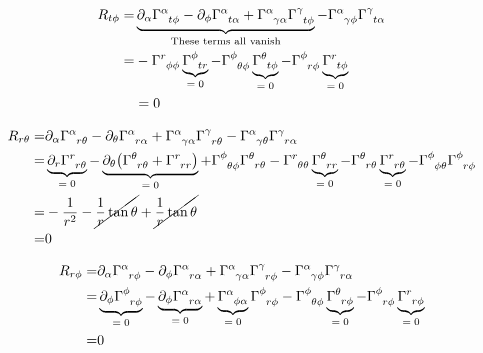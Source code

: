 \documentclass[]{article}
\begin{document}
\begin{align*}
	R_{t\phi} =& \underbrace{\partial_\alpha \Gamma\indices{^\alpha_{t\phi}} - \partial_\phi \Gamma\indices{^\alpha_{t\alpha}} + \Gamma\indices{^\alpha_{\gamma\alpha}} \Gamma\indices{^\gamma_{t\phi}} }_\text{These terms all vanish}- \Gamma\indices{^\alpha_{\gamma\phi}} \Gamma\indices{^\gamma_{t\alpha}}\\
	=& - \Gamma\indices{^r_{\phi\phi}} \underbrace{\Gamma\indices{^\phi_{tr}}}_\text{$=0$} - \Gamma\indices{^\phi_{\theta\phi}} \underbrace{\Gamma\indices{^\theta_{t\phi}}}_\text{$=0$}- \Gamma\indices{^\phi_{r\phi}} \underbrace{\Gamma\indices{^r_{t\phi}}}_\text{$=0$}\\
	&=0
\end{align*}

\begin{align*}
	R_{r\theta} =& \partial_\alpha \Gamma\indices{^\alpha_{r\theta}} - \partial_\theta \Gamma\indices{^\alpha_{r\alpha}} + \Gamma\indices{^\alpha_{\gamma\alpha}} \Gamma\indices{^\gamma_{r\theta}} - \Gamma\indices{^\alpha_{\gamma\theta}} \Gamma\indices{^\gamma_{r\alpha}}\\
	=& \underbrace{\partial_r \Gamma\indices{^r_{r\theta}}}_\text{$=0$} - \underbrace{\partial_\theta \big(\Gamma\indices{^\theta_{r\theta}}+\Gamma\indices{^r_{rr}}\big)}_\text{$=0$} + \Gamma\indices{^\phi_{\theta\phi}} \Gamma\indices{^\theta_{r\theta}} - \Gamma\indices{^r_{\theta\theta}} \underbrace{\Gamma\indices{^\theta_{rr}}}_\text{$=0$} - \Gamma\indices{^\theta_{r\theta}} \underbrace{\Gamma\indices{^r_{r\theta}}}_\text{$=0$}- \Gamma\indices{^\phi_{\phi\theta}} \Gamma\indices{^\phi_{r\phi}}\\
	=&-\frac{1}{r^2} -\cancel{\frac{1}{r}\tan \theta} + \cancel{\frac{1}{r}\tan \theta}\\
	=& 0
\end{align*}

\begin{align*}
	R_{r\phi} =& \partial_\alpha \Gamma\indices{^\alpha_{r\phi}} - \partial_\phi \Gamma\indices{^\alpha_{r\alpha}} + \Gamma\indices{^\alpha_{\gamma\alpha}} \Gamma\indices{^\gamma_{r\phi}} - \Gamma\indices{^\alpha_{\gamma\phi}} \Gamma\indices{^\gamma_{r\alpha}}\\
	=& \underbrace{\partial_\phi \Gamma\indices{^\phi_{r\phi}}}_\text{$=0$} - \underbrace{\partial_\phi \Gamma\indices{^\alpha_{r\alpha}}}_\text{$=0$} + \underbrace{\Gamma\indices{^\alpha_{\phi\alpha}}}_\text{$=0$} \Gamma\indices{^\phi_{r\phi}} - \Gamma\indices{^\phi_{\theta\phi}} \underbrace{\Gamma\indices{^\theta_{r\phi}}}_\text{$=0$} - \Gamma\indices{^\phi_{r\phi}} \underbrace{\Gamma\indices{^r_{r\phi}}}_\text{$=0$}\\
	=&0
\end{align*}
\end{document}
